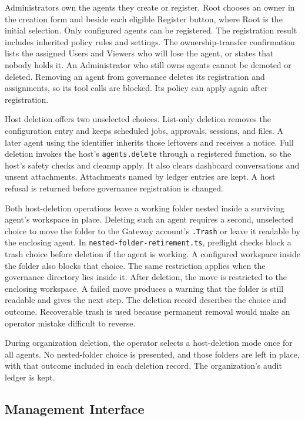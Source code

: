 {\color{red}Administrators own the agents they create or register. Root chooses
an owner in the creation form and beside each eligible Register button, where
Root is the initial selection. Only configured agents can be registered.
The registration result includes inherited policy rules and settings. The
ownership-transfer confirmation lists the assigned Users and Viewers who will
lose the agent, or states that nobody holds it. An Administrator who still owns agents cannot be demoted or
deleted. Removing an agent from governance deletes its registration and
assignments, so its tool calls are blocked. Its policy can apply again after
registration.

Host deletion offers two unselected choices. List-only deletion removes the
configuration entry and keeps scheduled jobs, approvals, sessions, and files.
A later agent using the identifier inherits those leftovers and receives a
notice. Full deletion invokes the host's \texttt{agents.delete} through a
registered function, so the host's safety checks and cleanup apply. It also
clears dashboard conversations and unsent attachments. Attachments named by
ledger entries are kept. A host refusal is returned before governance
registration is changed.

Both host-deletion operations leave a working folder nested inside a surviving
agent's workspace in place. Deleting such an agent requires a second, unselected choice to
move the folder to the Gateway account's \texttt{.Trash} or leave it readable
by the enclosing agent. In \texttt{nested-folder-retirement.ts}, preflight
checks block a trash choice before deletion if the agent is working. A
configured workspace inside the folder also blocks that choice. The same
restriction applies when the governance directory lies inside it.
After deletion, the move is restricted to the
enclosing workspace. A failed move produces a warning that the folder is
still readable and gives the next step. The deletion record describes the
choice and outcome. Recoverable trash is used because permanent removal
would make an operator mistake difficult to reverse.

During organization deletion, the operator selects a host-deletion mode once
for all agents. No nested-folder choice is presented, and those folders are left in place,
with that outcome included in each deletion record. The organization's audit
ledger is kept.}

\subsection{Management Interface}
\label{sec:gov-dashboard}

